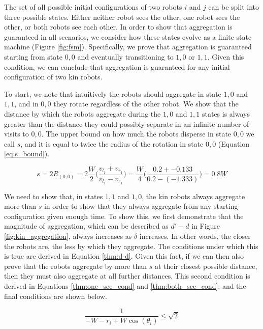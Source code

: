 \documentclass[conference]{IEEEtran}
\begin{document}
    The set of all possible initial configurations of two robots $i$ and $j$ can be split into three possible states. Either neither robot sees the other, one robot sees the other, or both robots see each other. In order to show that aggregation is guaranteed in all scenarios, we consider how these states evolve as a finite state machine (Figure \ref{fig:fsm}). Specifically, we prove that aggregation is guaranteed starting from state $0,0$ and eventually transitioning to $1,0$ or $1,1$. Given this condition, we can conclude that aggregation is guaranteed for any initial configuration of two kin robots.

    To start, we note that intuitively the robots should aggregate in state $1,0$ and $1,1$, and in $0,0$ they rotate regardless of the other robot. We show that the distance by which the robots aggregate during the $1,0$ and $1,1$ states is always greater than the distance they could possibly separate in an infinite number of visits to $0,0$. The upper bound on how much the robots disperse in state $0,0$ we call $s$, and it is equal to twice the radius of the rotation in state $0,0$ (Equation \eqref{eq:s_bound}).

    \begin{equation} \label{eq:s_bound}
      s = 2R_{(0,0)} = 2\frac{W}{2}\bigg(\frac{v_{l_1} + v_{r_1}}{v_{l_1} - v_{r_1}}\bigg) = \frac{W}{4}\bigg(\frac{0.2 + -0.133}{0.2 - (-1.333)}\bigg) = 0.8W
    \end{equation}

    We need to show that, in states $1,1$ and $1,0$, the kin robots always aggregate more than $s$ in order to show that they always aggregate from any starting configuration given enough time. To show this, we first demonstrate that the magnitude of aggregation, which can be described as $d'-d$ in Figure \ref{fig:kin_aggregation}, always increases as $\delta$ increases. In other words, the closer the robots are, the less by which they aggregate. The conditions under which this is true are derived in Equation \ref{thm:d-d}. Given this fact, if we can then also prove that the robots aggregate by more than $s$ at their closest possible distance, then they must also aggregate at all further distances. This second condition is derived in Equations \ref{thm:one_see_cond} and \ref{thm:both_see_cond}, and the final conditions are shown below.

    \begin{equation} \label{eq:two_kin_cond_1}
        \frac{1}{-W-r_i+W\cos(\theta_i)} \leq \sqrt{2}
    \end{equation}
\end{document}
